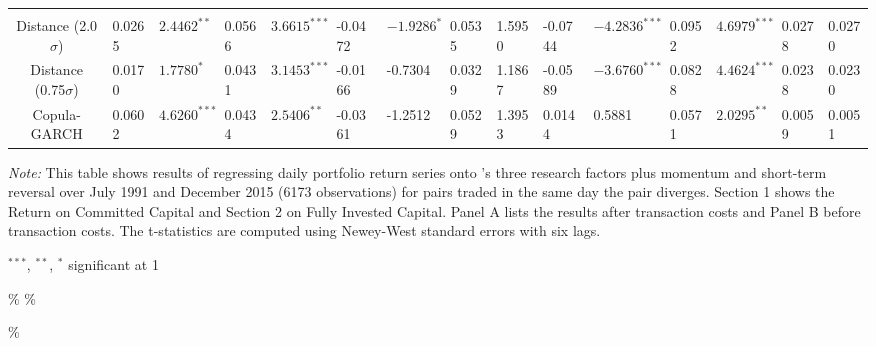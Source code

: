 \documentclass[a4paper]{article}
\begin{document}
\begin{sidewaystable}
\begin{threeparttable}[H]
\begin{tabularx}{\textwidth}{@{\extracolsep{\fill}}lllllllllllllll@{}}
				&       &       &       &       &       &       &       &       &       &       &       &       &       &  \\
				\multicolumn{1}{c}{Distance (2.0$\sigma$)} & 0.0265 & $2.4462^{**}$ & 0.0566 & $3.6615^{***}$ & -0.0472 & $-1.9286^{*}$ & 0.0535 & 1.5950 & -0.0744 & $-4.2836^{***}$ & 0.0952 & $4.6979^{***}$ & 0.0278 & 0.0270 \\
				\multicolumn{1}{c}{Distance (0.75$\sigma$)} & 0.0170 & $1.7780^{*}$ & 0.0431 & $3.1453^{***}$ & -0.0166 & -0.7304 & 0.0329 & 1.1867 & -0.0589 & $-3.6760^{***}$ & 0.0828 & $4.4624^{***}$ & 0.0238 & 0.0230 \\
				\multicolumn{1}{c}{Copula-GARCH} & 0.0602 & $4.6260^{***}$ & 0.0434 & $2.5406^{**}$ & -0.0361 & -1.2512 & 0.0529 & 1.3953 & 0.0144 & 0.5881 & 0.0571 & $2.0295^{**}$ & 0.0059 & 0.0051\\
				\bottomrule
			\end{tabularx}
			\begin{tablenotes}
				\item \textit{Note:} \scriptsize  This table shows results of regressing daily portfolio return series onto \citet*{ff93}'s three research factors plus momentum and short-term reversal over July 1991 and December 2015 (6173 observations) for pairs traded in the same day the pair diverges. Section 1 shows the Return on Committed Capital and Section 2 on Fully Invested Capital. Panel A lists the results after transaction costs and Panel B before transaction costs. The t-statistics are computed using Newey-West standard errors with six lags.
				\item \scriptsize $^{\ast\ast\ast}$, $^{\ast\ast}$, $^{\ast}$  significant at 1\\%
			\end{tablenotes}
		\end{threeparttable}\%
		\label{tab:table108}\%
	\end{sidewaystable}\%
	
\end{document}
